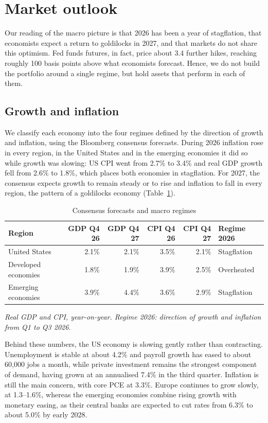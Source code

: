 \section*{Market outlook}\label{sec:outlook}

Our reading of the macro picture is that 2026 has been a year of
stagflation, that economists expect a return to goldilocks in 2027, and
that markets do not share this optimism. Fed funds futures, in fact,
price about 3.4 further hikes, reaching roughly 100 basis points above
what economists forecast. Hence, we do not build the portfolio around a
single regime, but hold assets that perform in each of them.

\subsection*{Growth and inflation}\label{sec:growth-inflation}

We classify each economy into the four regimes defined by the direction
of growth and inflation, using the Bloomberg consensus forecasts. During
2026 inflation rose in every region, in the United States and in the
emerging economies it did so while growth was slowing: US CPI went from
2.7\% to 3.4\% and real GDP growth fell from 2.6\% to 1.8\%, which
places both economies in stagflation. For 2027, the consensus expects
growth to remain steady or to rise and inflation to fall in every
region, the pattern of a goldilocks economy (Table~\ref{tab:regimes}). \cite{ecfc}

\begin{table}[!htb]
\centering
\small
\caption{Consensus forecasts and macro regimes}\label{tab:regimes}
\begin{tabular}{@{}lrrrrl@{}}
\toprule
Region & GDP Q4 26 & GDP Q4 27 & CPI Q4 26 & CPI Q4 27 & Regime 2026 \\
\midrule
United States & 2.1\% & 2.1\% & 3.5\% & 2.1\% & Stagflation \\
Developed economies & 1.8\% & 1.9\% & 3.9\% & 2.5\% & Overheated \\
Emerging economies & 3.9\% & 4.4\% & 3.6\% & 2.9\% & Stagflation \\
\bottomrule
\end{tabular}

\smallskip
\footnotesize\emph{Real GDP and CPI, year-on-year. Regime 2026: direction of growth
and inflation from Q1 to Q3 2026. \cite{ecfc}}
\end{table}

Behind these numbers, the US economy is slowing gently rather than
contracting. Unemployment is stable at about 4.2\% and payroll growth
has eased to about 60,000 jobs a month, while private investment remains
the strongest component of demand, having grown at an annualised 7.4\%
in the third quarter. Inflation is still the main concern, with core PCE
at 3.3\%. Europe continues to grow slowly, at 1.3--1.6\%, whereas the
emerging economies combine rising growth with monetary easing, as their
central banks are expected to cut rates from 6.3\% to about 5.0\% by
early 2028. \cite{ecfc}

